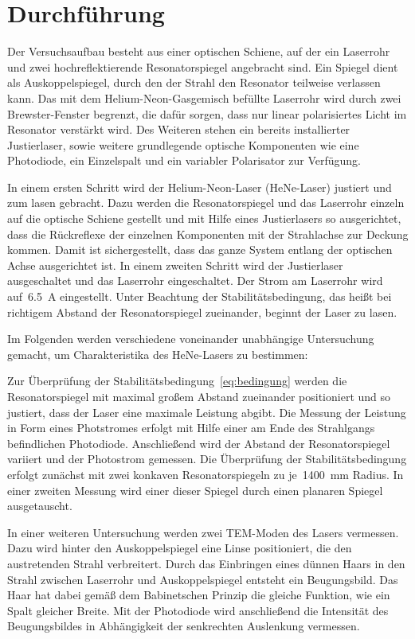 \section{Durchführung}
\label{sec:durchführung}

Der Versuchsaufbau besteht aus einer optischen Schiene, auf der ein Laserrohr
und zwei hochreflektierende Resonatorspiegel angebracht sind. Ein Spiegel dient
als Auskoppelspiegel, durch den der Strahl den Resonator teilweise
verlassen kann. Das mit dem Helium-Neon-Gasgemisch befüllte Laserrohr wird
durch zwei Brewster-Fenster begrenzt, die dafür sorgen, dass nur linear
polarisiertes Licht im Resonator verstärkt wird. Des Weiteren stehen ein bereits
installierter Justierlaser, sowie weitere grundlegende optische Komponenten wie
eine Photodiode, ein Einzelspalt und ein variabler Polarisator zur Verfügung.

In einem ersten Schritt wird der Helium-Neon-Laser (HeNe-Laser) justiert und zum lasen
gebracht. Dazu werden die Resonatorspiegel und das Laserrohr einzeln auf die
optische Schiene gestellt und mit Hilfe eines Justierlasers so ausgerichtet,
dass die Rückreflexe der einzelnen Komponenten mit der Strahlachse zur Deckung
kommen. Damit ist sichergestellt, dass das ganze System entlang der optischen
Achse ausgerichtet ist. In einem zweiten Schritt wird der Justierlaser
ausgeschaltet und das Laserrohr eingeschaltet. Der Strom am Laserrohr wird
auf~\SI{6.5}{\ampere} eingestellt. Unter Beachtung der Stabilitätsbedingung,
das heißt bei richtigem Abstand der Resonatorspiegel zueinander, beginnt der
Laser zu lasen.

Im Folgenden werden verschiedene voneinander unabhängige Untersuchung gemacht,
um Charakteristika des HeNe-Lasers zu bestimmen:

Zur Überprüfung der Stabilitätsbedingung~\eqref{eq:bedingung} werden die
Resonatorspiegel mit maximal großem Abstand zueinander positioniert und so
justiert, dass der Laser eine maximale Leistung abgibt. Die Messung der
Leistung in Form eines Photstromes erfolgt mit Hilfe einer am Ende des Strahlgangs befindlichen
Photodiode. Anschließend wird der Abstand der Resonatorspiegel variiert und der
Photostrom gemessen. Die Überprüfung der Stabilitätsbedingung erfolgt zunächst
mit zwei konkaven Resonatorspiegeln zu je~\SI{1400}{\milli\metre} Radius. In
einer zweiten Messung wird einer dieser Spiegel durch einen planaren Spiegel
ausgetauscht.

In einer weiteren Untersuchung werden zwei TEM-Moden des Lasers vermessen.
Dazu wird hinter den Auskoppelspiegel eine Linse positioniert, die den
austretenden Strahl verbreitert. Durch das Einbringen eines dünnen Haars in den
Strahl zwischen Laserrohr und Auskoppelspiegel entsteht ein Beugungsbild. Das
Haar hat dabei gemäß dem Babinetschen Prinzip die gleiche Funktion, wie ein
Spalt gleicher Breite. Mit der Photodiode wird anschließend die Intensität des
Beugungsbildes in Abhängigkeit der senkrechten Auslenkung vermessen.

